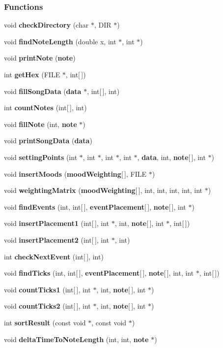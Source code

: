 \subsubsection*{Functions}
\begin{DoxyCompactItemize}
\item 
void {\bf check\+Directory} (char $\ast$, D\+I\+R $\ast$)
\item 
void {\bf find\+Note\+Length} (double x, int $\ast$, int $\ast$)
\item 
void {\bf print\+Note} ({\bf note})
\item 
int {\bf get\+Hex} (F\+I\+L\+E $\ast$, int[$\,$])
\item 
void {\bf fill\+Song\+Data} ({\bf data} $\ast$, int[$\,$], int)
\item 
int {\bf count\+Notes} (int[$\,$], int)
\item 
void {\bf fill\+Note} (int, {\bf note} $\ast$)
\item 
void {\bf print\+Song\+Data} ({\bf data})
\item 
void {\bf setting\+Points} (int $\ast$, int $\ast$, int $\ast$, int $\ast$, {\bf data}, int, {\bf note}[$\,$], int $\ast$)
\item 
void {\bf insert\+Moods} ({\bf mood\+Weighting}[$\,$], F\+I\+L\+E $\ast$)
\item 
void {\bf weighting\+Matrix} ({\bf mood\+Weighting}[$\,$], int, int, int, int, int $\ast$)
\item 
void {\bf find\+Events} (int, int[$\,$], {\bf event\+Placement}[$\,$], {\bf note}[$\,$], int $\ast$)
\item 
void {\bf insert\+Placement1} (int[$\,$], int $\ast$, int, {\bf note}[$\,$], int $\ast$, int[$\,$])
\item 
void {\bf insert\+Placement2} (int[$\,$], int $\ast$, int)
\item 
int {\bf check\+Next\+Event} (int[$\,$], int)
\item 
void {\bf find\+Ticks} (int, int[$\,$], {\bf event\+Placement}[$\,$], {\bf note}[$\,$], int, int $\ast$, int[$\,$])
\item 
void {\bf count\+Ticks1} (int[$\,$], int $\ast$, int, {\bf note}[$\,$], int $\ast$)
\item 
void {\bf count\+Ticks2} (int[$\,$], int $\ast$, int, {\bf note}[$\,$], int $\ast$)
\item 
int {\bf sort\+Result} (const void $\ast$, const void $\ast$)
\item 
void {\bf delta\+Time\+To\+Note\+Length} (int, int, {\bf note} $\ast$)

\end{DoxyCompactItemize}

